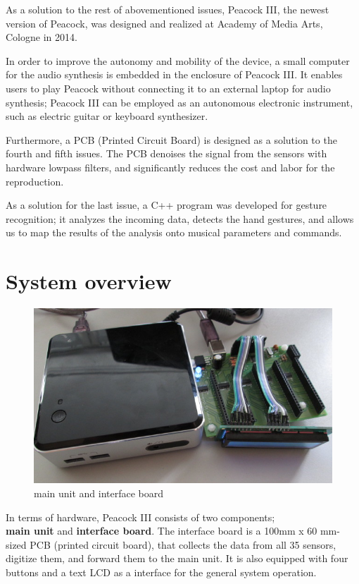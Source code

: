 \documentclass{nime-alternate}
\begin{document}
As a solution to the rest of abovementioned issues, Peacock III, the newest version of Peacock, was designed and realized at Academy of Media Arts, Cologne in 2014.

In order to improve the autonomy and mobility of the device, a small computer for the audio synthesis is embedded in the enclosure of Peacock III. It enables users to play Peacock without connecting it to an external laptop for audio synthesis; Peacock III can be employed as an autonomous electronic instrument, such as electric guitar or keyboard synthesizer. 

Furthermore, a PCB (Printed Circuit Board) is designed as a solution to the fourth and fifth issues. The PCB  denoises the signal from the sensors with hardware lowpass filters, and significantly reduces the cost and labor for the reproduction. 

As a solution for the last issue, a C++ program was developed for gesture recognition; it analyzes the incoming data, detects the hand gestures, and allows us to map the results of the analysis onto musical parameters and commands.

\section{System overview}
\begin{figure}[htbp]
       \begin{center}
              \includegraphics[scale=0.9]{interface_main.jpg}
       \end{center}
       \caption{main unit and interface board}
       \label{fig:interface_main}
\end{figure}

In terms of hardware, Peacock III consists of two components;\\
\textbf{main unit} and \textbf{interface board}. The interface board is a 100mm x 60 mm-sized PCB (printed circuit board), that collects the data from all 35 sensors, digitize them, and forward them to the main unit. It is also equipped with four buttons and a text LCD as a interface for the general system operation.
\end{document}
